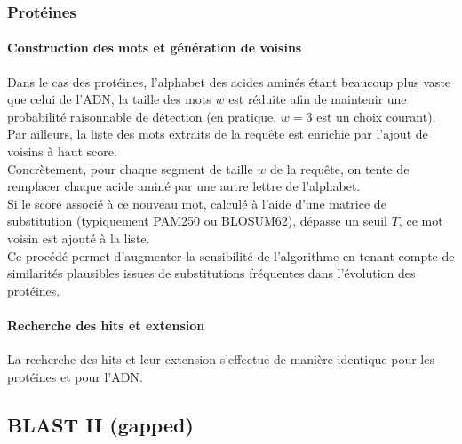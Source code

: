 \documentclass[conference]{IEEEtran}
\begin{document}
\subsubsection{Protéines}

\paragraph{Construction des mots et génération de voisins}
Dans le cas des protéines, l’alphabet des acides aminés étant beaucoup plus vaste que celui de l’ADN, la taille des mots $w$ est réduite afin de maintenir une probabilité raisonnable de détection (en pratique, $w = 3$ est un choix courant).\\
Par ailleurs, la liste des mots extraits de la requête est enrichie par l’ajout de voisins à haut score.\\
Concrètement, pour chaque segment de taille $w$ de la requête, on tente de remplacer chaque acide aminé par une autre lettre de l’alphabet.\\
Si le score associé à ce nouveau mot, calculé à l’aide d’une matrice de substitution (typiquement PAM250 ou BLOSUM62), dépasse un seuil $T$, ce mot voisin est ajouté à la liste.\\
Ce procédé permet d’augmenter la sensibilité de l’algorithme en tenant compte de similarités plausibles issues de substitutions fréquentes dans l’évolution des protéines.

\paragraph{Recherche des hits et extension}
La recherche des hits et leur extension s’effectue de manière identique pour les protéines et pour l’ADN.



\subsection{BLAST II (gapped)}
\end{document}
